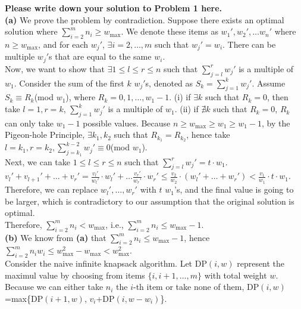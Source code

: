 \documentclass[11pt,twoside]{article}
\newenvironment{solution}{{\par\noindent\it Solution.}}{}
\begin{document}
\begin{solution}
\textbf{Please write down your solution to Problem 1 here.}
\vspace{10pt}\\
\textbf{(a)} We prove the problem by contradiction. Suppose there exists an optimal solution where $\sum_{i=2}^{m}n_i\geq w_{\text{max}}$.
We denote these items as $w_1',w_2',\dots w_n'$ where $n\geq w_{\text{max}}$, and for each $w_j'$, $\exists i=2,\dots, m$ such that $w_j'=w_i$. 
There can be multiple $w_j'$s that are equal to the same $w_i$.
\vspace{10pt}\\
Now, we want to show that $\exists 1\leq l\leq r\leq n$ such that $\sum_{j=l}^{r}w_j'$ is a multiple of $w_1$.
Consider the sum of the first $k$ $w_j'$s, denoted as $S_k=\sum_{j=1}^{k}w_j'$. Assume $S_k\equiv R_k$(mod $w_1$), where $R_k=0,1,\dots,w_1-1$.
(i) if $\exists k$ such that $R_k=0$, then take $l=1,r=k$, $\sum_{j=1}^{k}w_j'$ is a multiple of $w_1$. 
(ii) if $\nexists k$ such that $R_k=0$, $R_k$ can only take $w_1-1$ possible values. Because $n\geq w_{\text{max}}\geq w_1\geq w_1-1$,
by the Pigeon-hole Principle, $\exists k_1,k_2$ such that $R_{k_1}=R_{k_2}$, hence take $l=k_1,r=k_2,\sum_{j=k_1}^{k-2}w_j'\equiv 0$(mod $w_1$).
\vspace{10pt}\\
Next, we can take $1\leq l\leq r\leq n$ such that $\sum_{j=l}^{r}w_j'=t\cdot w_1$.
$v_l'+v_{l+1}'+\dots+v_r'=\frac{v_l'}{w_l'}\cdot w_l'+\dots \frac{v_r'}{w_r'}\cdot w_r'\leq\frac{v_2}{w_2}\cdot(w_l'+\dots+w_r')<\frac{v_1}{w_1}\cdot t\cdot w_1$.
Therefore, we can replace $w_l',\dots,w_r'$ with $t$ $w_1$'s, and the final value is going to be larger, which is contradictory to our assumption that the original solution is optimal.
\vspace{10pt}\\
Therefore, $\sum_{i=2}^{m}n_i<w_{\text{max}}$, i.e., $\sum_{i=2}^{m}n_i\leq w_{\text{max}}-1$.
\vspace{10pt}\\
\textbf{(b)} We know from \textbf{(a)} that $\sum_{i=2}^{m}n_{i}\leq w_{\text{max}}-1$,
hence  $\sum_{i=2}^{m}n_{i}w_{i}\leq w_{\text{max}}^2-w_{\text{max}}<w_{\text{max}}^2$. 
\vspace{10pt}\\
Consider the naive infinite knapsack algorithm. Let DP$(i, w)$ represent the maximul value by choosing from items $\{i, i+1,\dots,m\}$
with total weight $w$. Because we can either take $n_i$ the $i$-th item or take none of them, DP$(i, w)$=max\{DP$(i+1, w)$, $v_i$+DP$(i, w-w_i)$\}. 

\end{solution}
\end{document}

